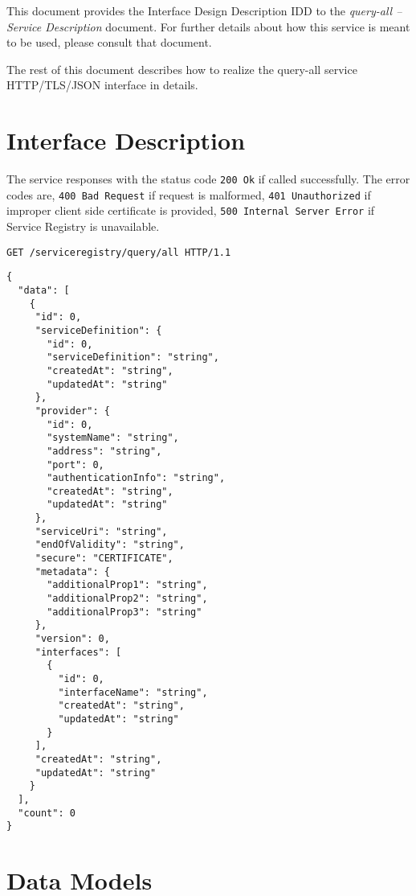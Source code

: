 \documentclass[a4paper]{arrowhead}
\newcommand{\fref}[1]{{\textcolor{ArrowheadBlue}{\hyperref[sec:functions:#1]{#1}}}}
\begin{document}
This document provides the Interface Design Description IDD to the \textit{query-all -- Service Description} document.
For further details about how this service is meant to be used, please consult that document.

The rest of this document describes how to realize the query-all service HTTP/TLS/JSON interface in details.

\newpage

\section{Interface Description}
\label{sec:functions}

The service responses with the status code \texttt{200
  Ok} if called successfully. The error codes are, \texttt{400
  Bad Request} if request is malformed, \texttt{401 Unauthorized} if
improper client side certificate is provided, \texttt{500 Internal
  Server Error} if Service Registry is unavailable.

\begin{lstlisting}[language=http,label={lst:register},caption={A \fref{query-all} invocation.}]
GET /serviceregistry/query/all HTTP/1.1
\end{lstlisting}

\begin{lstlisting}[language=http,label={lst:register_response},caption={A \fref{query-all} response.}]
{
  "data": [
    {
     "id": 0,
     "serviceDefinition": {
       "id": 0,
       "serviceDefinition": "string",
       "createdAt": "string",
       "updatedAt": "string"
     },
     "provider": {
       "id": 0,
       "systemName": "string",
       "address": "string",
       "port": 0,
       "authenticationInfo": "string",
       "createdAt": "string",
       "updatedAt": "string"
     },
     "serviceUri": "string",
     "endOfValidity": "string",
     "secure": "CERTIFICATE",
     "metadata": {
       "additionalProp1": "string",
       "additionalProp2": "string",
       "additionalProp3": "string"
     },
     "version": 0,
     "interfaces": [
       {
         "id": 0,
         "interfaceName": "string",
         "createdAt": "string",
         "updatedAt": "string"
       }
     ],
     "createdAt": "string",
     "updatedAt": "string"
    }
  ],
  "count": 0
}
\end{lstlisting}

\newpage

\section{Data Models}
\label{sec:model}
\end{document}
